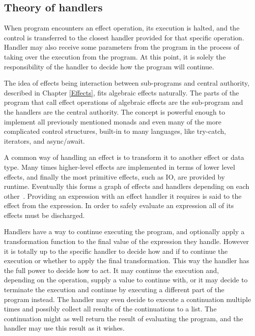 \subsection{Theory of handlers}
When program encounters an effect operation, its execution is halted, and the control is transferred to the closest handler provided for that specific operation. Handler may also receive some parameters from the program in the process of taking over the execution from the program. At this point, it is solely the responsibility of the handler to decide how the program will continue.

The idea of effects being interaction between sub-programs and central authority, described in Chapter \ref{Effects}, fits algebraic effects naturally. The parts of the program that call effect operations of algebraic effects are the sub-program and the handlers are the central authority.  The concept is powerful enough to implement all previously mentioned monads and even many of the more complicated control structures, built-in to many languages, like try-catch, iterators, and async/await.~\cite{alg-effs-for-fp}

A common way of handling an effect is to transform it to another effect or data type. Many times higher-level effects are implemented in terms of lower level effects, and finally the most primitive effects, such as IO, are provided by runtime. Eventually this forms a graph of effects and handlers depending on each other~\cite{intro-to-alg-eff}. Providing an expression with an effect handler it requires is said to  the effect from the expression. In order to safely evaluate an expression all of its effects must be discharged.

Handlers have a way to continue executing the program, and optionally apply a transformation function to the final value of the expression they handle. However it is totally up to the specific handler to decide how and if to continue the execution or whether to apply the final transformation. This way the handler has the full power to decide how to act. It may continue the execution and, depending on the operation, supply a value to continue with, or it may decide to terminate the execution and continue by executing a different part of the program instead. The handler may even decide to execute a continuation multiple times and possibly collect all results of the continuations to a list. The continuation might as well return the result of evaluating the program, and the handler may use this result as it wishes.

